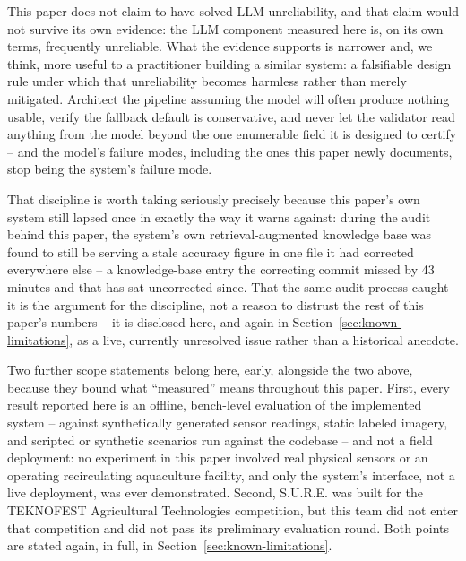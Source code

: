 This paper does not claim to have solved LLM unreliability, and that claim would not survive its
own evidence: the LLM component measured here is, on its own terms, frequently unreliable. What the
evidence supports is narrower and, we think, more useful to a practitioner building a similar
system: a falsifiable design rule under which that unreliability becomes harmless rather than
merely mitigated. Architect the pipeline assuming the model will often produce nothing usable,
verify the fallback default is conservative, and never let the validator read anything from the
model beyond the one enumerable field it is designed to certify -- and the model's failure modes,
including the ones this paper newly documents, stop being the system's failure mode.

That discipline is worth taking seriously precisely because this paper's own system still lapsed
once in exactly the way it warns against: during the audit behind this paper, the system's own
retrieval-augmented knowledge base was found to still be serving a stale accuracy figure in one file
it had corrected everywhere else -- a knowledge-base entry the correcting commit missed by 43
minutes and that has sat uncorrected since. That the same audit process caught it is the argument
for the discipline, not a reason to distrust the rest of this paper's numbers -- it is disclosed
here, and again in Section~\ref{sec:known-limitations}, as a live, currently unresolved issue rather
than a historical anecdote.

Two further scope statements belong here, early, alongside the two above, because they bound what
``measured'' means throughout this paper. First, every result reported here is an offline,
bench-level evaluation of the implemented system -- against synthetically generated sensor readings,
static labeled imagery, and scripted or synthetic scenarios run against the codebase -- and not a
field deployment: no experiment in this paper involved real physical sensors or an operating
recirculating aquaculture facility, and only the system's interface, not a live deployment, was ever
demonstrated. Second,
S.U.R.E. was built for the TEKNOFEST Agricultural Technologies competition, but this team did not
enter that competition and did not pass its preliminary evaluation round. Both points are stated
again, in full, in Section~\ref{sec:known-limitations}.



